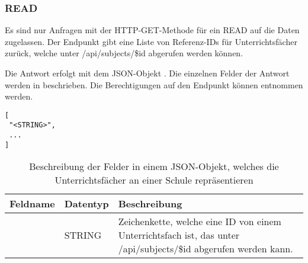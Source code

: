 \subsubsection{READ}
\label{sec:rest:api:schools:subjects:read}
Es sind nur Anfragen mit der HTTP-GET-Methode für ein READ auf die Daten zugelassen.
Der Endpunkt gibt eine Liste von Referenz-IDs für Unterrichtsfächer zurück, welche unter /api/subjects/\$id abgerufen werden können.

Die Antwort erfolgt mit dem JSON-Objekt . 
Die einzelnen Felder der Antwort werden in  beschrieben.
Die Berechtigungen auf den Endpunkt können  entnommen werden.


\begin{lstlisting}[caption={JSON-Antwort für einen GET-Aufruf der Route /api/schools/\$id/subjects},label={lst:code:rest:api:schools:subjects:read:ret},frame=tlrb]
[
 "<STRING>",
 ...
]
\end{lstlisting}
\begin{longtable}{|p{}|p{}|p{}|}
		\caption{Beschreibung der Felder in einem JSON-Objekt, welches die Unterrichtsfächer an einer Schule repräsentieren}
\endfoot
		\caption{Beschreibung der Felder in einem JSON-Objekt, welches die Unterrichtsfächer an einer Schule repräsentieren}
		\label{tab:rest:api:schools:subjects:read:ret:json}
\endlastfoot 
\hline
			\textbf{Feldname} & \textbf{Datentyp} & \textbf{Beschreibung} \\ \hline
\endhead
 & STRING & Zeichenkette, welche eine ID von einem Unterrichtsfach ist, das unter /api/subjects/\$id abgerufen werden kann. \\ \hline
\end{longtable}